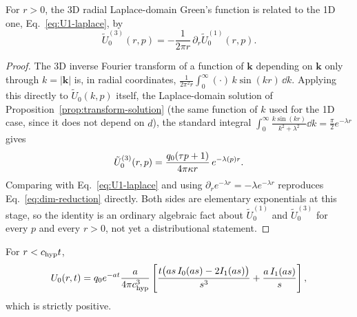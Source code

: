\begin{proposition}
\label{prop:dimension-reduction}
For $r>0$, the 3D radial Laplace-domain Green's function is related to the
1D one, Eq.~\eqref{eq:U1-laplace}, by
\begin{equation}
  \label{eq:dim-reduction}
  \tilde U_0^{(3)}(r,p) = -\frac{1}{2\pi r}\,\partial_r\tilde U_0^{(1)}(r,p) .
\end{equation}
\end{proposition}

\begin{proof}
The 3D inverse Fourier transform of a function of $\mathbf k$ depending on
$\mathbf k$ only through $k=|\mathbf k|$ is, in radial coordinates,
$\tfrac1{2\pi^2r}\int_0^\infty(\cdot)\,k\sin(kr)\,\dd k$. Applying this
directly to $\tilde U_0(k,p)$ itself, the Laplace-domain solution of
Proposition~\ref{prop:transform-solution} (the same function of $k$ used
for the 1D case, since it does not depend on $d$), the standard integral
$\int_0^\infty\tfrac{k\sin(kr)}{k^2+\lambda^2}\dd k=\tfrac\pi2e^{-\lambda
r}$ gives
\begin{equation}
  \tilde U_0^{(3)}(r,p) = \frac{q_0(\tau p+1)}{4\pi\kappa r}\,e^{-\lambda(p) r} .
\end{equation}
Comparing with Eq.~\eqref{eq:U1-laplace} and using $\partial_r
e^{-\lambda r}=-\lambda e^{-\lambda r}$ reproduces
Eq.~\eqref{eq:dim-reduction} directly. Both sides are elementary
exponentials at this stage, so the identity is an ordinary algebraic fact
about $\tilde U_0^{(1)}$ and $\tilde U_0^{(3)}$ for every $p$ and every
$r>0$, not yet a distributional statement.
\end{proof}

\begin{corollary}
\label{cor:3d-smooth}
For $r<c_{\rm hyp} t$,
\begin{equation}
  \label{eq:U3d-smooth}
  U_0(r,t) = q_0e^{-at}\frac{a}{4\pi c_{\rm hyp}^3}\left[
    \frac{t\big(as\,I_0(as)-2I_1(as)\big)}{s^3}
    + \frac{a\,I_1(as)}{s}\right] ,
\end{equation}
which is strictly positive.
\end{corollary}

